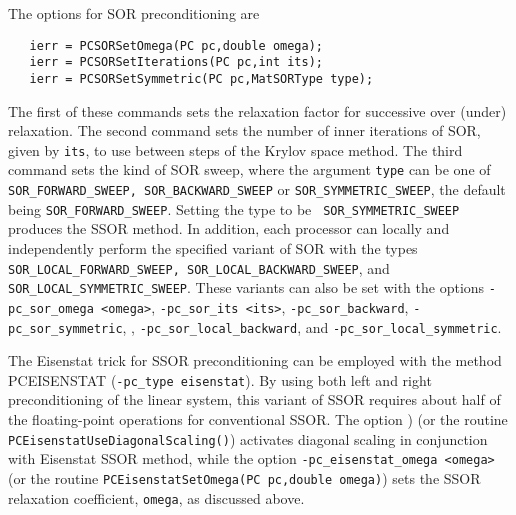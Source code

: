 The options for SOR   
preconditioning are 
\begin{verbatim}
   ierr = PCSORSetOmega(PC pc,double omega);
   ierr = PCSORSetIterations(PC pc,int its);
   ierr = PCSORSetSymmetric(PC pc,MatSORType type);
\end{verbatim}
The  
first of these commands sets the relaxation factor for successive
over (under) relaxation.  The second command sets the number of inner
iterations of SOR, given by {\tt its}, to use between steps of the
Krylov space method.  The third command sets the kind of SOR sweep,
where the argument {\tt type} can be one of {\tt SOR\_FORWARD\_SWEEP,
SOR\_BACKWARD\_SWEEP} or {\tt SOR\_SYMMETRIC\_SWEEP}, the default
being {\tt SOR\_FORWARD\_SWEEP}. Setting the type to be {\tt
SOR\_SYMMETRIC\_SWEEP} produces the SSOR method.  In addition, 
each processor can locally and independently perform the specified 
variant of SOR with the types {\tt SOR\_LOCAL\_FORWARD\_SWEEP, 
SOR\_LOCAL\_BACKWARD\_SWEEP}, and {\tt SOR\_LOCAL\_SYMMETRIC\_SWEEP}.
These  
variants  
can  
also be set with the options {\tt -pc\_sor\_omega <omega>}, 
{\tt -pc\_sor\_its <its>}, {\tt -pc\_sor\_backward}, {\tt -pc\_sor\_symmetric}, 
, {\tt -pc\_sor\_local\_backward}, and 
{\tt -pc\_sor\_local\_symmetric}.
 
 
 

The Eisenstat trick \cite{eisenstat81}  for SSOR preconditioning 
can be employed with the method PCEISENSTAT  
({\tt -pc\_type eisenstat}).  
By using both left and right preconditioning of the linear system,
this variant of SSOR requires about half of the floating-point operations 
for conventional SSOR.  
 The option 
) 
(or the routine {\tt PCEisenstatUseDiagonalScaling()})
activates diagonal scaling in conjunction with Eisenstat SSOR method, while
the option {\tt -pc\_eisenstat\_omega <omega>} (or the routine
{\tt PCEisenstatSetOmega(PC pc,double omega)})
sets the SSOR relaxation coefficient, {\tt omega}, as discussed above.
  

